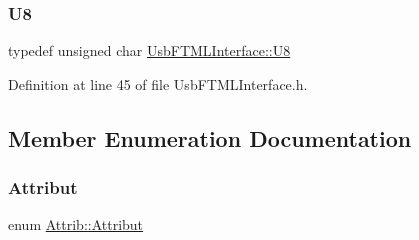 \mbox{\label{classUsbFTMLInterface_af7c9f02ee6f59fefa68ef14f90dcbbd8}} 
\subsubsection{\texorpdfstring{U8}{U8}}
{\footnotesize\ttfamily typedef unsigned char \hyperlink{classUsbFTMLInterface_af7c9f02ee6f59fefa68ef14f90dcbbd8}{Usb\+F\+T\+M\+L\+Interface\+::\+U8}}



Definition at line 45 of file Usb\+F\+T\+M\+L\+Interface.\+h.



\subsection{Member Enumeration Documentation}
\mbox{\label{classAttrib_a69e171d7cc6417835a5a306d3c764235}} 
\subsubsection{\texorpdfstring{Attribut}{Attribut}}
{\footnotesize\ttfamily enum \hyperlink{classAttrib_a69e171d7cc6417835a5a306d3c764235}{Attrib\+::\+Attribut}\hspace{0.3cm}{\ttfamily [inherited]}}

